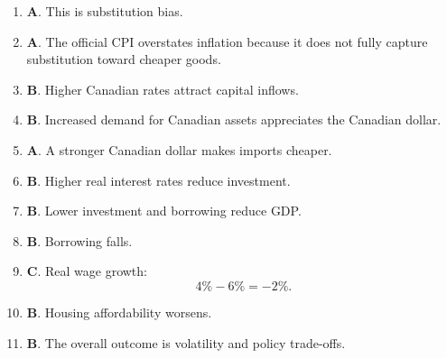 \documentclass[12pt]{article}
\begin{document}
\begin{enumerate}
\item \textbf{A}. This is substitution bias.

\item \textbf{A}. The official CPI overstates inflation because it does not fully capture substitution toward cheaper goods.

\item \textbf{B}. Higher Canadian rates attract capital inflows.

\item \textbf{B}. Increased demand for Canadian assets appreciates the Canadian dollar.

\item \textbf{A}. A stronger Canadian dollar makes imports cheaper.

\item \textbf{B}. Higher real interest rates reduce investment.

\item \textbf{B}. Lower investment and borrowing reduce GDP.

\item \textbf{B}. Borrowing falls.

\item \textbf{C}. Real wage growth:
\[
4\%-6\%=-2\%.
\]

\item \textbf{B}. Housing affordability worsens.

\item \textbf{B}. The overall outcome is volatility and policy trade-offs.
\end{enumerate}
\end{document}
